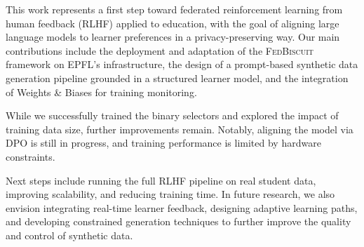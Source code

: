 This work represents a first step toward federated reinforcement learning from human feedback (RLHF) applied to education, with the goal of aligning large language models to learner preferences in a privacy-preserving way. Our main contributions include the deployment and adaptation of the \textsc{FedBiscuit} framework on EPFL's infrastructure, the design of a prompt-based synthetic data generation pipeline grounded in a structured learner model, and the integration of Weights \& Biases for training monitoring.

While we successfully trained the binary selectors and explored the impact of training data size, further improvements remain. Notably, aligning the model via DPO is still in progress, and training performance is limited by hardware constraints.

Next steps include running the full RLHF pipeline on real student data, improving scalability, and reducing training time. In future research, we also envision integrating real-time learner feedback, designing adaptive learning paths, and developing constrained generation techniques to further improve the quality and control of synthetic data.
